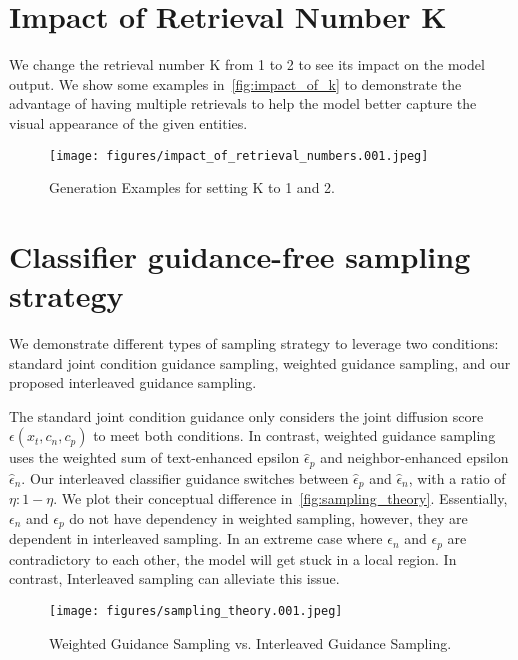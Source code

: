 \documentclass{article} \usepackage{iclr2023_conference,times}
\begin{document}
\clearpage
\section{Impact of Retrieval Number K}
\label{appendix:impact_of_k}
We change the retrieval number K from 1 to 2 to see its impact on the model output. We show some examples in~\autoref{fig:impact_of_k} to demonstrate the advantage of having multiple retrievals to help the model better capture the visual appearance of the given entities.  
\begin{figure}[!h]
    \centering
    \texttt{[image: figures/impact\_of\_retrieval\_numbers.001.jpeg]}
    \caption{Generation Examples for setting K to 1 and 2. }
    \vspace{-1ex}
    \label{fig:impact_of_k}
\end{figure}

\clearpage
\section{Classifier guidance-free sampling strategy}
We demonstrate different types of sampling strategy to leverage two conditions: standard joint condition guidance sampling, weighted guidance sampling, and our proposed interleaved guidance sampling. 

The standard joint condition guidance only considers the joint diffusion score $\epsilon(x_t, c_n, c_p)$ to meet both conditions. In contrast, weighted guidance sampling uses the weighted sum of text-enhanced epsilon $\hat{\epsilon}_p$ and neighbor-enhanced epsilon $\hat{\epsilon}_n$. Our interleaved classifier guidance switches between $\hat{\epsilon}_p$ and $\hat{\epsilon}_n$, with a ratio of $\eta : 1 - \eta$. We plot their conceptual difference in~\autoref{fig:sampling_theory}. Essentially, $\epsilon_n$ and $\epsilon_p$ do not have dependency in weighted sampling, however, they are dependent in interleaved sampling. In an extreme case where $\epsilon_n$ and $\epsilon_p$ are contradictory to each other, the model will get stuck in a local region. In contrast, Interleaved sampling can alleviate this issue.

\begin{figure}[!h]
    \centering
    \texttt{[image: figures/sampling\_theory.001.jpeg]}
    \caption{Weighted Guidance Sampling vs. Interleaved Guidance Sampling. }
    \vspace{-1ex}
    \label{fig:sampling_theory}
\end{figure}
\end{document}
